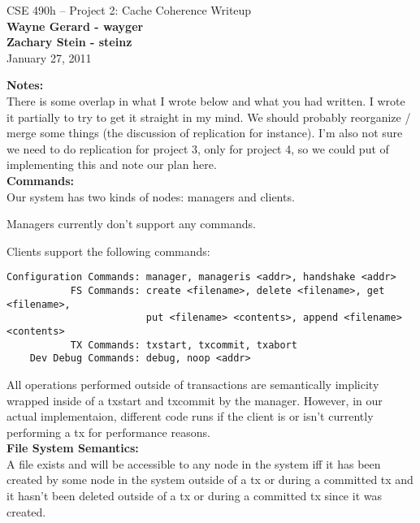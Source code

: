 \documentclass[11pt]{article}
\begin{document}
\begin{center}
{\large CSE 490h -- Project 2: Cache Coherence Writeup} \\
\textbf{Wayne Gerard - wayger} \\
\textbf{Zachary Stein - steinz} \\
January 27, 2011
\end{center}

\textbf{Notes:} \\

There is some overlap in what I wrote below and what you had written. I wrote it partially to try to get it straight in my mind. We should probably reorganize / merge some things (the discussion of replication for instance). I'm also not sure we need to do replication for project 3, only for project 4, so we could put of implementing this and note our plan here. \\

\textbf{Commands:} \\

Our system has two kinds of nodes: managers and clients.

Managers currently don't support any commands.

Clients support the following commands:
\begin{verbatim}
Configuration Commands: manager, manageris <addr>, handshake <addr>
           FS Commands: create <filename>, delete <filename>, get <filename>, 
                        put <filename> <contents>, append <filename> <contents>
           TX Commands: txstart, txcommit, txabort
    Dev Debug Commands: debug, noop <addr>
\end{verbatim}

All operations performed outside of transactions are semantically implicity wrapped inside of a txstart and txcommit by the manager.
However, in our actual implementaion, different code runs if the client is or isn't currently performing a tx for performance reasons. \\

\textbf{File System Semantics:} \\

A file exists and will be accessible to any node in the system iff it has been created by some node in the system outside of a tx or during a committed tx 
and it hasn't been deleted outside of a tx or during a committed tx since it was created.
\end{document}
